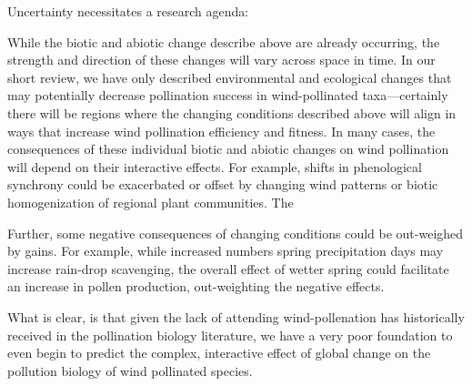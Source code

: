 \documentclass[12pt]{article}
\begin{document}
Uncertainty necessitates a research agenda:

While the biotic and abiotic change describe above are already occurring, the strength and direction of these changes will vary across space in time. In our short review, we have only described environmental and ecological changes that may potentially decrease pollination success in wind-pollinated taxa---certainly there will be regions where the changing conditions described above will align in ways that increase wind pollination efficiency and fitness. In many cases, the consequences of these individual biotic and abiotic changes on wind pollination will depend on their interactive effects. For example, shifts in phenological synchrony could be exacerbated or offset by changing wind patterns or biotic homogenization of regional plant communities. The



Further, some negative consequences of changing conditions could be out-weighed by gains. For example, while increased numbers spring precipitation days may increase rain-drop scavenging, the overall effect of wetter spring could facilitate an increase in pollen production, out-weighting the negative effects.


What is clear, is that given the lack of attending wind-pollenation has historically received in the pollination biology literature, we have a very poor foundation to even begin to predict the complex, interactive effect of global change on the pollution biology of wind pollinated species.



 
\end{document}
